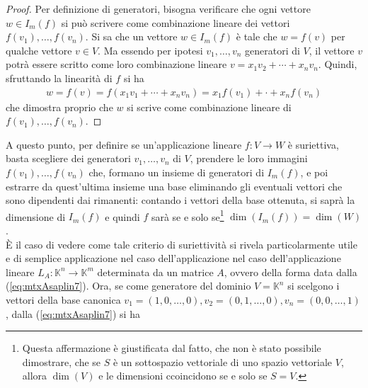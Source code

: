 \begin{proof}
  Per definizione di generatori, bisogna verificare che ogni vettore
  $w\in I_m(f)$ si può scrivere come combinazione lineare dei vettori
  $f(v_1),\dots,f(v_n)$. Si sa che un vettore $w\in I_m(f)$ è tale che
  $w=f(v)$ per qualche vettore $v\in V.$ Ma essendo per ipotesi $v_1,
  \dots,v_n$ generatori di $V$, il vettore $v$ potrà essere scritto come
  loro combinazione lineare $v=x_1v_2+\cdots+x_nv_n$. Quindi, sfruttando
  la linearità di $f$ si ha
  \begin{eqnarray*}
    w=f(v)=f(x_1v_1+\cdots+x_nv_n)=x_1f(v_1)+\cdot+x_nf(v_n)
  \end{eqnarray*}
  che dimostra proprio che $w$ si scrive come combinazione lineare di
  $f(v_1),\dots,f(v_n)$.
\end{proof}
A questo punto, per definire se un'applicazione lineare $f:V\to W$ è
suriettiva, basta scegliere dei generatori $v_1,\dots,v_n$ di $V$,
prendere le loro immagini $f(v_1),\dots,f(v_n)$ che, formano un insieme
di generatori di $I_m(f)$, e poi estrarre da quest'ultima insieme una
base eliminando gli eventuali vettori che sono dipendenti dai rimanenti:
contando i vettori della base ottenuta, si saprà la dimensione di
$I_m(f)$ e quindi $f$ sarà se e solo se\footnote{Questa affermazione è
  giustificata dal fatto, che non è stato possibile dimostrare, che se
  $S$ è un sottospazio vettoriale di uno spazio vettoriale $V$, allora
  $\dim (V)$ e le dimensioni ccoincidono se e solo se $S=V$.}
$\dim(I_m(f))=\dim(W)$.\\
È il caso di vedere come tale criterio di suriettività si rivela
particolarmente utile e di semplice applicazione nel caso
dell'applicazione nel caso dell'applicazione lineare $L_A:\mathds{K}^n
\to \mathds{K}^m$ determinata da un matrice $A$, ovvero della forma data
dalla (\ref{eq:mtxAsaplin7}). Ora, se come generatore del dominio
$V=\mathds{K}^n$ si scelgono i vettori della base canonica $v_1=
(1,0,\dots,0),v_2=(0,1,\dots,0),v_n=(0,0,\dots,1)$, dalla
(\ref{eq:mtxAsaplin7}) si ha
